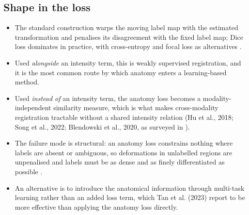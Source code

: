 \subsection{Shape in the loss}
\begin{itemize}
\item The standard construction warps the moving label map with the estimated transformation and penalises its disagreement with the fixed label map; Dice loss dominates in practice, with cross-entropy and focal loss as alternatives \citep{chen2025survey}.
\item Used \emph{alongside} an intensity term, this is weakly supervised registration, and it is the most common route by which anatomy enters a learning-based method.
\item Used \emph{instead of} an intensity term, the anatomy loss becomes a modality-independent similarity measure, which is what makes cross-modality registration tractable without a shared intensity relation (Hu et al., 2018; Song et al., 2022; Blendowski et al., 2020, as surveyed in \citealp{chen2025survey}). %
\item The failure mode is structural: an anatomy loss constrains nothing where labels are absent or ambiguous, so deformations in unlabelled regions are unpenalised and labels must be as dense and as finely differentiated as possible \citep{chen2025survey}.
\item An alternative is to introduce the anatomical information through multi-task learning rather than an added loss term, which Tan et al. (2023) report to be more effective than applying the anatomy loss directly. %
\end{itemize}

